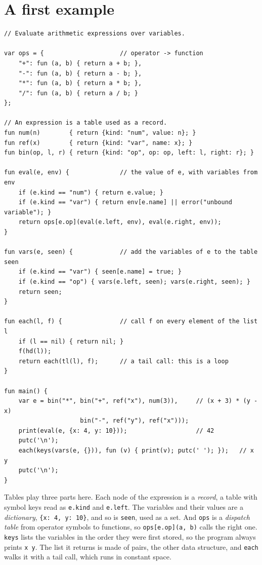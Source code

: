 \documentclass[11pt,a4paper]{article}
\begin{document}
\section{A first example}

\begin{lstlisting}
// Evaluate arithmetic expressions over variables.

var ops = {                     // operator -> function
    "+": fun (a, b) { return a + b; },
    "-": fun (a, b) { return a - b; },
    "*": fun (a, b) { return a * b; },
    "/": fun (a, b) { return a / b; }
};

// An expression is a table used as a record.
fun num(n)        { return {kind: "num", value: n}; }
fun ref(x)        { return {kind: "var", name: x}; }
fun bin(op, l, r) { return {kind: "op", op: op, left: l, right: r}; }

fun eval(e, env) {              // the value of e, with variables from env
    if (e.kind == "num") { return e.value; }
    if (e.kind == "var") { return env[e.name] || error("unbound variable"); }
    return ops[e.op](eval(e.left, env), eval(e.right, env));
}

fun vars(e, seen) {             // add the variables of e to the table seen
    if (e.kind == "var") { seen[e.name] = true; }
    if (e.kind == "op") { vars(e.left, seen); vars(e.right, seen); }
    return seen;
}

fun each(l, f) {                // call f on every element of the list l
    if (l == nil) { return nil; }
    f(hd(l));
    return each(tl(l), f);      // a tail call: this is a loop
}

fun main() {
    var e = bin("*", bin("+", ref("x"), num(3)),     // (x + 3) * (y - x)
                     bin("-", ref("y"), ref("x")));
    print(eval(e, {x: 4, y: 10}));                   // 42
    putc('\n');
    each(keys(vars(e, {})), fun (v) { print(v); putc(' '); });   // x y
    putc('\n');
}
\end{lstlisting}
Tables play three parts here. Each node of the expression is a
\emph{record}, a table with symbol keys read as \verb|e.kind| and
\verb|e.left|. The variables and their values are a \emph{dictionary},
\verb|{x: 4, y: 10}|, and so is \verb|seen|, used as a set. And \verb|ops|
is a \emph{dispatch table} from operator symbols to functions, so
\verb|ops[e.op](a, b)| calls the right one. \texttt{keys} lists the
variables in the order they were first stored, so the program always prints
\texttt{x y}. The list it returns is made of pairs, the other data structure,
and \verb|each| walks it with a tail call, which runs in constant space.
\end{document}
